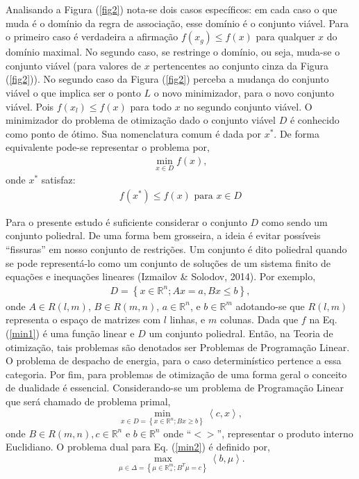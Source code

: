 \documentclass[12pt,fleqn]{article}
\begin{document}
Analisando a Figura (\ref{fig2}) nota-se dois casos espec\'ificos: em cada caso o que muda \'e o dom\'inio da regra de associa\c c\~ao, esse dom\'inio \'e o conjunto vi\'avel. Para o primeiro caso \'e verdadeira a afirma\c c\~ao $f(x_g)
\leq f(x)$ para qualquer $x$ do dom\'inio maximal. No segundo caso, se restringe o dom\'inio, ou seja, muda-se o conjunto vi\'avel (para valores de $x$ pertencentes ao conjunto cinza da Figura (\ref{fig2})). No segundo caso da Figura (\ref{fig2}) perceba a mudan\c ca do conjunto vi\'avel o que implica ser o ponto $L$ o novo minimizador, para o novo conjunto vi\'avel. Pois $f(x_l) \leq f(x)$ para todo $x$ no segundo conjunto vi\'avel. O  minimizador do problema de
otimiza\c c\~ao dado o conjunto vi\'avel $D$ \'e conhecido como ponto de \'otimo. Sua nomenclatura comum \'e dada por ${x}^{*}$.  De forma equivalente pode-se
representar o problema por,
\begin{align}
  \min_{x\in D} f(x) ,
  \label {min1}
\end{align}
onde ${x}^{*}$ satisfaz:
\begin{align}
	  f({x}^{*}) \leq f(x) \mbox{ para }x \in D \nonumber
\end{align}

Para o presente estudo \'e suficiente considerar o conjunto $D$ como sendo um conjunto poliedral. De uma forma bem grosseira, a ideia \'e evitar
poss\'iveis ``fissuras'' em nosso conjunto de restri\c c\~oes. Um conjunto  \'e dito poliedral  quando se pode represent\'a-lo como um conjunto de solu\c c\~oes de um sistema finito de equa\c c\~oes e inequa\c c\~oes lineares (Izmailov \& Solodov, 2014). Por exemplo,
\begin{align}
  D = \left\{ x \in \mathbb{R}^{n}; Ax = a, Bx \leq b\right\},\nonumber
\end{align}
onde $A \in R(l,m)$, $B \in R(m,n)$, $a \in \mathbb{R}^{n}$, e $b \in \mathbb{R}^{m}$ adotando-se que $R(l,m)$ representa o
espa\c co de matrizes com $l$ linhas, e $m$ colunas. Dada que $f$ na Eq.(\ref {min1}) \'e uma fun\c c\~ao linear e $D$ um conjunto
poliedral. Ent\~ao, na Teoria de otimiza\c c\~ao, tais problemas s\~ao denotados ser Problemas de Programa\c c\~ao Linear. O problema de despacho de energia, para o caso determin\'istico pertence a essa categoria. Por fim, para problemas de otimiza\c c\~ao de uma forma geral o conceito de dualidade \'e
essencial. Considerando-se um problema de Programa\c c\~ao Linear que ser\'a chamado de problema primal,
\begin{equation}
  \displaystyle\min_{ x \in D = \left\{ x \in \mathbb{R}^{n}; Bx \geq b \right\}} \left < c,x \right >, 
  \label{min2}
\end{equation}
onde $B \in R(m,n), c \in \mathbb{R}^{n}$ e $b \in \mathbb{R}^{n}$ onde ``$< >$'', representar o produto interno Euclidiano.
O problema dual para Eq. (\ref{min2}) \'e definido por,
\begin{equation}
  \max_{\mu \in \Delta = \left\{ \mu \in \mathbb{R}_+^m;
  {B}^{T} \mu = c \right\}} \left < b, \mu \right > .
\end{equation}
\end{document}
